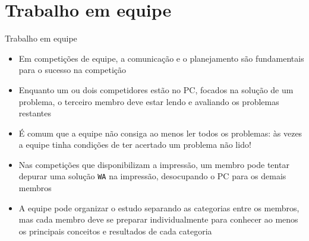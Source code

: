 \section{Trabalho em equipe}

\begin{frame}[fragile]{Trabalho em equipe}

    \begin{itemize}
        \item Em competições de equipe, a comunicação e o planejamento são fundamentais para o
            sucesso na competição

        \item Enquanto um ou dois competidores estão no PC, focados na solução de um problema,
            o terceiro membro deve estar lendo e avaliando os problemas restantes

        \item É comum que a equipe não consiga ao menos ler todos os problemas: às vezes a equipe
            tinha condições de ter acertado um problema não lido!

        \item Nas competições que disponibilizam a impressão, um membro pode tentar depurar uma
            solução \texttt{WA} na impressão, desocupando o PC para os demais membros

        \item A equipe pode organizar o estudo separando as categorias entre os membros, mas cada
            membro deve se preparar individualmente para conhecer ao menos os principais conceitos
            e resultados de cada categoria
    \end{itemize}

\end{frame}
